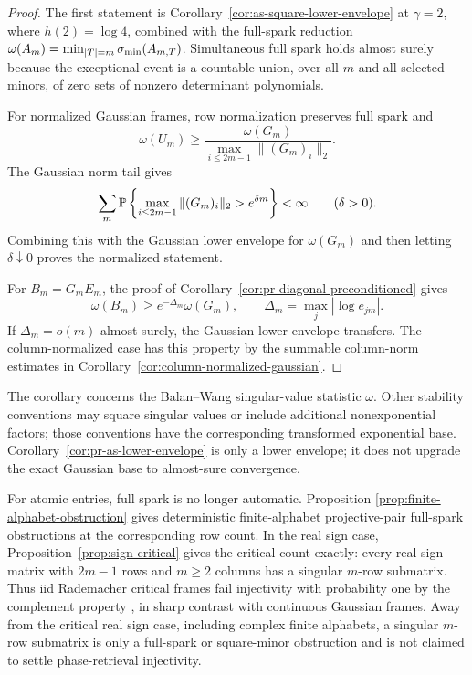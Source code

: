 \begin{proof}
The first statement is Corollary~\ref{cor:as-square-lower-envelope} at
\(\gamma=2\), where \(h(2)=\log4\), combined with the full-spark reduction
\(\omega(A_m)=\min_{|T|=m}\sigma_{\min}(A_{m,T})\).  Simultaneous full spark holds
almost surely because the exceptional event is a countable union, over all
\(m\) and all selected minors, of zero sets of nonzero determinant polynomials.

For normalized Gaussian frames, row normalization preserves full spark and
\[
  \omega(U_m)\ge
  \frac{\omega(G_m)}{\max_{i\le 2m-1}\|(G_m)_i\|_2}.
\]
The Gaussian norm tail gives
\[
  \sum_m
  \mathbb{P}\left\{\max_{i\le2m-1}\|(G_m)_i\|_2>e^{\delta m}\right\}<\infty
  \qquad(\delta>0).
\]
Combining this with the Gaussian lower envelope for \(\omega(G_m)\) and then
letting \(\delta\downarrow0\) proves the normalized statement.

For \(B_m=G_mE_m\), the proof of
Corollary~\ref{cor:pr-diagonal-preconditioned} gives
\[
  \omega(B_m)\ge e^{-\Delta_m}\omega(G_m),
  \qquad \Delta_m=\max_j|\log e_{jm}|.
\]
If \(\Delta_m=o(m)\) almost surely, the Gaussian lower envelope transfers.
The column-normalized case has this property by the summable column-norm
estimates in Corollary~\ref{cor:column-normalized-gaussian}.
\end{proof}

\begin{remark}
The corollary concerns the Balan--Wang singular-value statistic \(\omega\).
Other stability conventions may square singular values or include additional
nonexponential factors; those conventions have the corresponding transformed
exponential base.  Corollary~\ref{cor:pr-as-lower-envelope} is only a lower
envelope; it does not upgrade the exact Gaussian base to almost-sure
convergence.
\end{remark}

\begin{remark}
For atomic entries, full spark is no longer automatic.  Proposition
\ref{prop:finite-alphabet-obstruction} gives deterministic finite-alphabet
projective-pair full-spark obstructions at the corresponding row count.  In the
real sign case, Proposition~\ref{prop:sign-critical} gives the critical count
exactly: every real sign matrix with \(2m-1\) rows and \(m\ge2\) columns has a
singular \(m\)-row submatrix.  Thus iid Rademacher critical frames fail
injectivity with probability one by the complement property
\cite{BalanCasazzaEdidin2006,BandeiraCahillMixonNelson2014}, in sharp contrast
with continuous Gaussian frames.  Away from the critical real sign case,
including complex finite alphabets, a singular \(m\)-row submatrix is only a
full-spark or square-minor obstruction and is not claimed to settle
phase-retrieval injectivity.
\end{remark}

